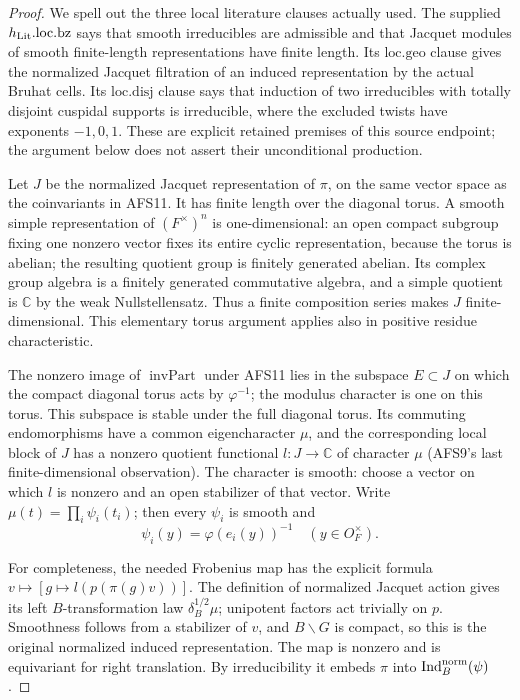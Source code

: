 \begin{proof}
We spell out the three local literature clauses actually used.
The supplied $h_{\rm Lit}.\mathrm{loc.bz}$ says that smooth
irreducibles are admissible and that Jacquet modules of smooth
finite-length representations have finite length.  Its
$\mathrm{loc.geo}$ clause gives the normalized Jacquet
filtration of an induced representation by the actual Bruhat
cells.  Its $\mathrm{loc.disj}$ clause says that induction of
two irreducibles with totally disjoint cuspidal supports is
irreducible, where the excluded twists have exponents
$-1,0,1$.  These are explicit retained premises of this
source endpoint; the argument below does not assert their
unconditional production.

Let $J$ be the normalized Jacquet representation of $\pi$,
on the same vector space as the coinvariants in AFS11.  It
has finite length over the diagonal torus.  A smooth simple
representation of $(F^\times)^n$ is one-dimensional: an
open compact subgroup fixing one nonzero vector fixes its
entire cyclic representation, because the torus is abelian;
the resulting quotient group is finitely generated abelian.
Its complex group algebra is a finitely generated
commutative algebra, and a simple quotient is $\mathbb C$
by the weak Nullstellensatz.  Thus a finite composition
series makes $J$ finite-dimensional.  This elementary torus
argument applies also in positive residue characteristic.

The nonzero image of $\operatorname{invPart}$ under AFS11
lies in the subspace $E\subset J$ on which the compact
diagonal torus acts by $\varphi^{-1}$; the modulus character
is one on this torus.  This subspace is stable under the
full diagonal torus.  Its commuting endomorphisms have a
common eigencharacter $\mu$, and the corresponding local
block of $J$ has a nonzero quotient functional
$l:J\to\mathbb C$ of character $\mu$ (AFS9's last
finite-dimensional observation).  The character is smooth:
choose a vector on which $l$ is nonzero and an open
stabilizer of that vector.  Write
$\mu(t)=\prod_i\psi_i(t_i)$; then every $\psi_i$ is smooth
and
\[
                 \psi_i(y)=\varphi(e_i(y))^{-1}
                                      \quad(y\in O_F^\times).
\]

For completeness, the needed Frobenius map has the explicit
formula $v\mapsto[g\mapsto l(p(\pi(g)v))]$.
The definition of normalized Jacquet action gives its left
$B$-transformation law $\delta_B^{1/2}\mu$; unipotent factors
act trivially on $p$.  Smoothness follows from a stabilizer
of $v$, and $B\backslash G$ is compact, so this is the
original normalized induced representation.  The map is
nonzero and is equivariant for right translation.  By
irreducibility it embeds $\pi$ into
$\operatorname{Ind}^{\rm norm}_B(\psi)$.


\end{proof}
